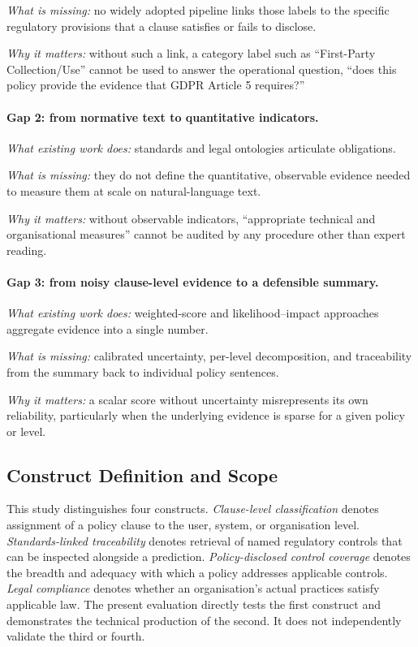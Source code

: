 \documentclass[final,3p,times,twocolumn]{elsarticle}
\begin{document}
	\emph{What is missing:} no widely adopted pipeline links those labels to the specific regulatory provisions that a clause satisfies or fails to disclose. 
    
    \emph{Why it matters:} without such a link, a category label such as ``First-Party 	Collection/Use'' cannot be used to answer the operational question, ``does this policy provide the evidence that GDPR Article 5 requires?''
    
	\paragraph{Gap 2: from normative text to quantitative indicators.}
    
	\emph{What existing work does:} standards \citep{gdpr2016,iso27001_2022,nist_pf_2020} and legal ontologies \citep{palmirani2018pronto} articulate obligations. 
    
    \emph{What	is missing:} they do not define the quantitative, observable evidence needed to measure them at scale on natural-language text. 
    
    \emph{Why it matters:} without observable indicators, ``appropriate technical and organisational measures'' cannot be audited by any procedure other than expert reading.
	
    \paragraph{Gap 3: from noisy clause-level evidence to a defensible summary.}
	
    \emph{What existing work does:} weighted-score \citep{novikova2025privacyrisks} and likelihood--impact \citep{brooks2017nistpram} approaches aggregate evidence into a single number.
    
    \emph{What is missing:} calibrated uncertainty,	per-level decomposition, and traceability from the summary back to individual policy sentences.
    
    \emph{Why it matters:} a scalar score without uncertainty misrepresents its own reliability, particularly when the underlying evidence is sparse for a given policy or level.

	\subsection{Construct Definition and Scope}
	\label{sec:construct} 
    

This study distinguishes four constructs. \emph{Clause-level classification} denotes assignment of a policy clause to the user, system, or organisation level. \emph{Standards-linked traceability} denotes retrieval of named regulatory controls that can be inspected alongside a prediction. \emph{Policy-disclosed control coverage} denotes the breadth and adequacy with which a policy addresses applicable controls. \emph{Legal compliance} denotes whether an organisation's actual practices satisfy applicable law. The present evaluation directly tests the first construct and demonstrates the technical production of the second. It does not independently validate the third or fourth.
\end{document}
